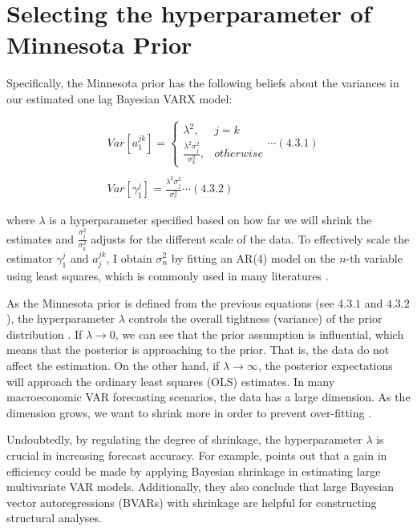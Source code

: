 \documentclass{monashthesis}
\begin{document}
\hypertarget{selecting-the-hyperparameter-of-minnesota-prior}{%
\section{Selecting the hyperparameter of Minnesota Prior}\label{selecting-the-hyperparameter-of-minnesota-prior}}

Specifically, the Minnesota prior has the following beliefs about the variances in our estimated one lag Bayesian VARX model:

\[
\begin{aligned}
&Var[a_1^{jk}]= 
\begin{cases}
\lambda^2,&j=k\\
\frac{\lambda^2\sigma^2_{j}}{\sigma^2_k},& otherwise
\end{cases}\cdots(4.3.1)\\
\\
&Var[\gamma_1^{j}]=\frac{\lambda^2\sigma^2_{j}}{\sigma^2_e}\cdots(4.3.2)
\end{aligned}
\]

where \(\lambda\) is a hyperparameter specified based on how far we will shrink the estimates and \(\frac{\sigma^2_{j}}{\sigma^2_k}\) adjusts for the different scale of the data. To effectively scale the estimator \(\gamma^j_1\) and \(a_j^{jk}\), I obtain \(\sigma_n^2\) by fitting an AR(4) model on the \(n\)-th variable using least squares, which is commonly used in many literatures \autocite{anderson2020,banbura2010large,koop2013}.

As the Minnesota prior is defined from the previous equations (see \(4.3.1\) and \(4.3.2\)), the hyperparameter \(\lambda\) controls the overall tightness (variance) of the prior distribution \autocite{banbura2010large}. If \(\lambda\rightarrow0\), we can see that the prior assumption is influential, which means that the posterior is approaching to the prior. That is, the data do not affect the estimation. On the other hand, if \(\lambda\rightarrow\infty\), the posterior expectations will approach the ordinary least squares (OLS) estimates. In many macroeconomic VAR forecasting scenarios, the data has a large dimension. As the dimension grows, we want to shrink more in order to prevent over-fitting \autocite{de2008}.

Undoubtedly, by regulating the degree of shrinkage, the hyperparameter \(\lambda\) is crucial in increasing forecast accuracy. For example, \textcite{banbura2010large} points out that a gain in efficiency could be made by applying Bayesian shrinkage in estimating large multivariate VAR models. Additionally, they also conclude that large Bayesian vector autoregressions (BVARs) with shrinkage are helpful for constructing structural analyses.
\end{document}

